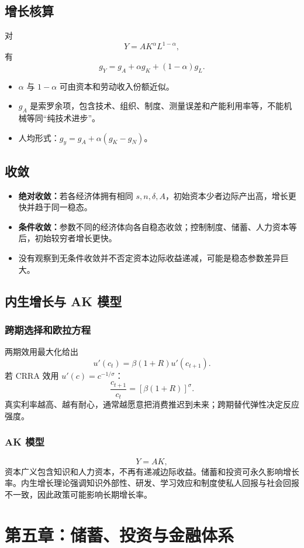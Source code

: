 \documentclass[UTF8,11pt,a4paper]{ctexart}
\newcommand{\term}[1]{\textbf{#1}}
\begin{document}
\subsection{增长核算}
对
\[
Y=AK^\alpha L^{1-\alpha},
\]
有
\[
g_Y=g_A+\alpha g_K+(1-\alpha)g_L.
\]
\begin{itemize}
  \item $\alpha$ 与 $1-\alpha$ 可由资本和劳动收入份额近似。
  \item $g_A$ 是索罗余项，包含技术、组织、制度、测量误差和产能利用率等，不能机械等同“纯技术进步”。
  \item 人均形式：$g_y=g_A+\alpha(g_K-g_N)$。
\end{itemize}

\subsection{收敛}
\begin{itemize}
  \item \term{绝对收敛：}若各经济体拥有相同 $s,n,\delta,A$，初始资本少者边际产出高，增长更快并趋于同一稳态。
  \item \term{条件收敛：}参数不同的经济体向各自稳态收敛；控制制度、储蓄、人力资本等后，初始较穷者增长更快。
  \item 没有观察到无条件收敛并不否定资本边际收益递减，可能是稳态参数差异巨大。
\end{itemize}

\subsection{内生增长与 AK 模型}
\subsubsection{跨期选择和欧拉方程}
两期效用最大化给出
\[
u'(c_t)=\beta(1+R)u'(c_{t+1}).
\]
若 CRRA 效用 $u'(c)=c^{-1/\sigma}$：
\[
\frac{c_{t+1}}{c_t}=[\beta(1+R)]^\sigma.
\]
真实利率越高、越有耐心，通常越愿意把消费推迟到未来；跨期替代弹性决定反应强度。

\subsubsection{AK 模型}
\[
Y=AK,
\]
资本广义包含知识和人力资本，不再有递减边际收益。储蓄和投资可永久影响增长率。内生增长理论强调知识外部性、研发、学习效应和制度使私人回报与社会回报不一致，因此政策可能影响长期增长率。

\newpage
\section{第五章：储蓄、投资与金融体系}
\end{document}
